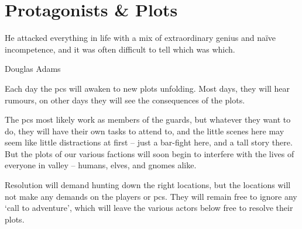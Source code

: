 \chapter{Protagonists \& Plots}
  \epigraph{He attacked everything in life with a mix of extraordinary genius and na\"ive incompetence, and it was often difficult to tell which was which.}{Douglas Adams}
\label{sideQuestIntro}

\noindent
Each day the \glspl{pc} will awaken to new plots unfolding.
Most days, they will hear rumours, on other days they will see the consequences of the plots.

The \glspl{pc} most likely work as members of the \glspl{guard}, but whatever they want to do, they will have their own tasks to attend to, and the little scenes here may seem like little distractions at first -- just a bar-fight here, and a tall story there.
But the plots of our various factions will soon begin to interfere with the lives of everyone in \gls{valley} -- humans, elves, and gnomes alike.

Resolution will demand hunting down the right locations, but the locations will not make any demands on the players or \glspl{pc}.
They will remain free to ignore any `call to adventure', which will leave the various actors below free to resolve their plots.

\printglossary[
  type=people,
  style=mcolindex,
]

\renewcommand\csComments{
  \label{Irina/greylands}
  \mapCircle{-4,3.4}{2}{Dyson_Logos/forgotten_city}
  \mapCircle{-5.6,-2.8}{2}{Dyson_Logos/qualme_temple}
  \mapCircle[4]{1.1,0.1}{2.5}{Dyson_Logos/town}
  \mapCircle{6.1,-3.6}{1.7}{Dyson_Logos/shadow_gate}
  \mapCircle{-1,-0.4}{2}{Dyson_Logos/redfall}
  \mapCircle{6.3,-0.1}{1.7}{Dyson_Logos/lakeside}
  \mapCircle{-6.3,2.3}{1.7}{Dyson_Logos/bandit_camp}
}


